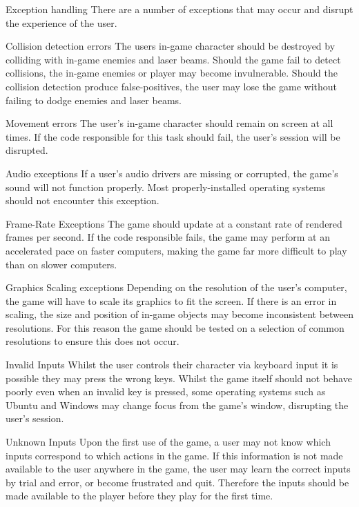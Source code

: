 
Exception handling
There are a number of exceptions that may occur and disrupt the experience of 
the user.

Collision detection errors
The users in-game character should be destroyed by colliding with in-game
enemies and laser beams. Should the game fail to detect collisions, the in-game
enemies or player may become invulnerable. Should the collision detection
produce false-positives, the user may lose the game without failing to dodge
enemies and laser beams.

Movement errors
The user's in-game character should remain on screen at all times. If the code
responsible for this task should fail, the user's session will be disrupted.

Audio exceptions
If a user's audio drivers are missing or corrupted, the game's sound will not
function properly. Most properly-installed operating systems should not
encounter this exception.

Frame-Rate Exceptions
The game should update at a constant rate of rendered frames per second. If the
code responsible fails, the game may perform at an accelerated pace on faster
computers, making the game far more difficult to play than on slower computers. 

Graphics Scaling exceptions
Depending on the resolution of the user's computer, the game will have to scale
its graphics to fit the screen. If there is an error in scaling, the size and 
position of in-game objects may become inconsistent between resolutions. For 
this reason the game should be tested on a selection of common resolutions to 
ensure this does not occur.

Invalid Inputs
Whilst the user controls their character via keyboard input it is possible they
may press the wrong keys. Whilst the game itself should not behave poorly even
when an invalid key is pressed, some operating systems such as Ubuntu and
Windows may change focus from the game's window, disrupting the user's session.

Unknown Inputs
Upon the first use of the game, a user may not know which inputs correspond to
which actions in the game. If this information is not made available to the user
anywhere in the game, the user may learn the correct inputs by trial and error,
or become frustrated and quit. Therefore the inputs should be made available to
the player before they play for the first time.
